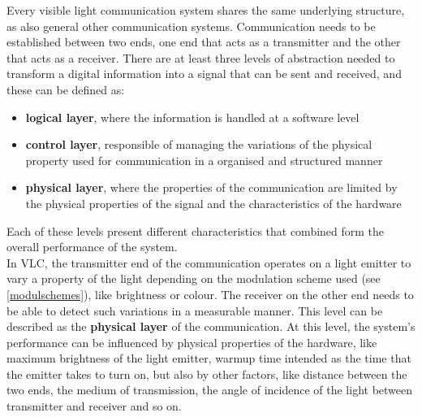 Every visible light communication system shares the same underlying structure, as also general other communication systems.
Communication needs to be established between two ends, one end that acts as a transmitter and the other that acts as a receiver.
There are at least three levels of abstraction needed to transform a digital information into a signal that can be sent and received, and these can be defined as: 
\begin{itemize}
\item \textbf{logical layer}, where the information is handled at a software level
\item \textbf{control layer}, responsible of managing the variations of the physical property used for communication in a organised and structured manner
\item \textbf{physical layer}, where the properties of the communication are limited by the physical properties of the signal and the characteristics of the hardware
\end{itemize}
Each of these levels present different characteristics that combined form the overall performance of the system.\\

In VLC, the transmitter end of the communication operates on a light emitter to vary a property of the light depending on the modulation scheme used (see \ref{modulschemes}), like brightness or colour.
The receiver on the other end needs to be able to detect such variations in a measurable manner.
This level can be described as the \textbf{physical layer} of the communication.
At this level, the system's performance can be influenced by physical properties of the hardware, like maximum brightness of the light emitter, warmup time intended as the time that the emitter takes to turn on, but also by other factors, like distance between the two ends, the medium of transmission, the angle of incidence of the light between transmitter and receiver and so on.\\

